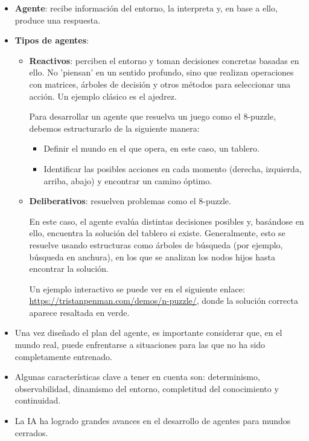\documentclass[a4paper,12pt]{article}
\begin{document}
\begin{itemize}
    \item \textbf{Agente}: recibe información del entorno, la interpreta y, en base a ello, produce una respuesta.
    \item \textbf{Tipos de agentes}:
    \begin{itemize}
        \item \textbf{Reactivos}: perciben el entorno y toman decisiones concretas basadas en ello. No 'piensan' en un sentido profundo, sino que realizan operaciones con matrices, árboles de decisión y otros métodos para seleccionar una acción. Un ejemplo clásico es el ajedrez.

        Para desarrollar un agente que resuelva un juego como el 8-puzzle, debemos estructurarlo de la siguiente manera:
        \begin{itemize}
            \item Definir el mundo en el que opera, en este caso, un tablero.
            \item Identificar las posibles acciones en cada momento (derecha, izquierda, arriba, abajo) y encontrar un camino óptimo.
        \end{itemize}

        \item \textbf{Deliberativos}: resuelven problemas como el 8-puzzle.  
        
        En este caso, el agente evalúa distintas decisiones posibles y, basándose en ello, encuentra la solución del tablero si existe.  
        Generalmente, esto se resuelve usando estructuras como árboles de búsqueda (por ejemplo, búsqueda en anchura), en los que se analizan los nodos hijos hasta encontrar la solución.  

        Un ejemplo interactivo se puede ver en el siguiente enlace:  
        \url{https://tristanpenman.com/demos/n-puzzle/}, donde la solución correcta aparece resaltada en verde.
    \end{itemize}
    
    \item Una vez diseñado el plan del agente, es importante considerar que, en el mundo real, puede enfrentarse a situaciones para las que no ha sido completamente entrenado.
    \item Algunas características clave a tener en cuenta son: determinismo, observabilidad, dinamismo del entorno, completitud del conocimiento y continuidad.
    \item La IA ha logrado grandes avances en el desarrollo de agentes para mundos cerrados.
\end{itemize}
\end{document}
